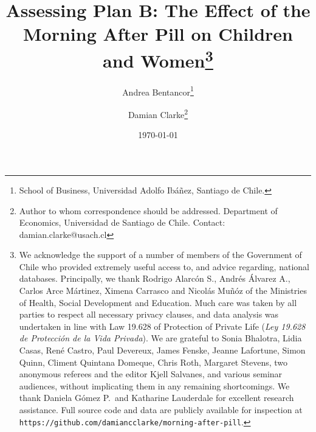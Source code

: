 \documentclass{article}[11pt,subeqn]
\title{Assessing Plan B: The Effect of the Morning After Pill on Children and 
Women\footnote{We acknowledge the support of a number of 
members of the Government of Chile who provided extremely useful access to, and 
advice regarding, national databases.  Principally, we thank Rodrigo Alarc\'on S., 
Andr\'es \'Alvarez A., Carlos Arce M\'artinez, Ximena Carrasco and Nicol\'as 
Mu\~n\'oz of the Ministries of Health, Social Development and Education.  Much 
care was taken by all parties to respect all necessary privacy clauses, and data 
analysis was undertaken in line with Law 19.628 of Protection of Private Life 
(\emph{Ley 19.628 de Protecci\'on de la Vida Privada}).  We are grateful to Sonia 
Bhalotra, Lidia Casas, Ren\'e Castro, Paul Devereux, James Fenske, Jeanne 
Lafortune, Simon Quinn, Climent Quintana Domeque, Chris Roth, Margaret Stevens,
two anonymous referees and the editor Kjell Salvanes, and various seminar
audiences, without implicating them in any remaining shortcomings. We thank
Daniela G\'omez P.\ and Katharine Lauderdale for excellent research assistance.
Full source code and data are publicly available for inspection at 
\texttt{https://github.com/damiancclarke/morning-after-pill}.}}
\author{Andrea Bentancor\thanks{School of Business, Universidad Adolfo Ib\'a\~nez, Santiago de Chile.} 
  \and Damian Clarke\thanks{Author to whom correspondence should be addressed. Department of
    Economics, Universidad de Santiago de Chile.  
Contact: damian.clarke@usach.cl}}
\date{\today}
\begin{document}
\begin{spacing}{1.4}
\maketitle



\end{spacing}
\end{document}
